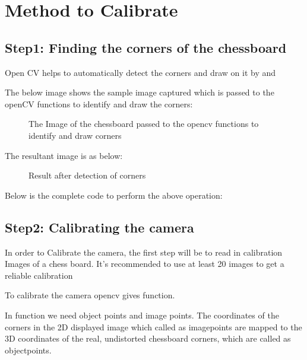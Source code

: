 \section{Method to Calibrate}
\subsection{Step1: Finding the corners of the chessboard}
Open CV helps to automatically detect the corners and draw on it by  and 

The below image shows the sample image captured which is passed to the openCV functions to identify and draw the corners: 
\begin{figure}[H]
	\centering
	\caption{The Image of the chessboard passed to the opencv functions to identify and draw corners}
\end{figure}
The resultant image is as below: 
\begin{figure}[H]
	\centering
	\caption{Result after detection of corners}
\end{figure}
Below is the complete code to perform the above operation: 
\begin{code}[H]
	
	\caption{Script to find and mark the corners on a chessboard image}\label{TensorFlow:Complete}
\end{code}
\subsection{Step2: Calibrating the camera}
In order to Calibrate the camera, the first step will be to read in calibration Images of a chess board. It’s recommended to use at least 20 images to get a reliable calibration \cite{Sadekar:2020} 

To calibrate the camera opencv gives function. 


In  function we need object points and image points.
The coordinates of the corners in the 2D displayed image which called as imagepoints are mapped to the 3D coordinates of the real, undistorted chessboard corners, which are called as objectpoints.

